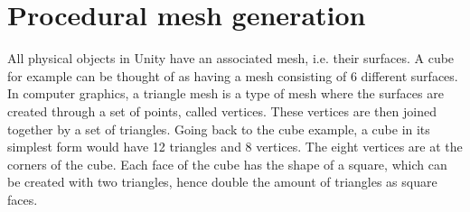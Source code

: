 \section{Procedural mesh generation}
    All physical objects in Unity have an associated mesh, i.e. their surfaces. A cube for example can be thought of as having a mesh consisting of 6 different surfaces. In computer graphics, a triangle mesh is a type of mesh where the surfaces are created through a set of points, called vertices. These vertices are then joined together by a set of triangles. Going back to the cube example, a cube in its simplest form would have 12 triangles and 8 vertices. The eight vertices are at the corners of the cube. Each face of the cube has the shape of a square, which can be created with two triangles, hence double the amount of triangles as square faces.